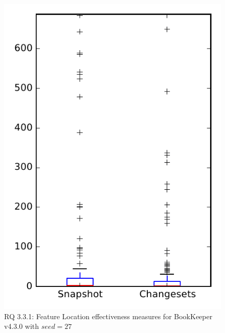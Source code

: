 
\begin{figure}
\centering
\includegraphics[height=0.4\textheight]{figures/flt_seed/rq1_bookkeeper_27}
\caption{RQ 3.3.1: Feature Location effectiveness measures for BookKeeper v4.3.0 with $seed=27$}
\label{fig:flt_seed:rq1:bookkeeper}
\end{figure}

